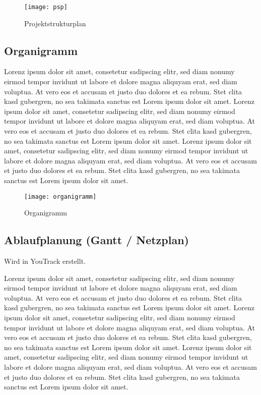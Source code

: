 \begin{figure}[H]
    \centering
    \texttt{[image: psp]}
    \caption{Projektstrukturplan}
\end{figure}

\subsection{Organigramm}\label{subsec:Organigramm}
Lorenz ipsum dolor sit amet, consetetur sadipscing elitr, sed diam nonumy eirmod tempor invidunt ut labore et dolore magna aliquyam erat, sed diam voluptua.
At vero eos et accusam et justo duo dolores et ea rebum.
Stet clita kasd gubergren, no sea takimata sanctus est Lorem ipsum dolor sit amet.
Lorenz ipsum dolor sit amet, consetetur sadipscing elitr, sed diam nonumy eirmod tempor invidunt ut labore et dolore magna aliquyam erat, sed diam voluptua.
At vero eos et accusam et justo duo dolores et ea rebum.
Stet clita kasd gubergren, no sea takimata sanctus est Lorem ipsum dolor sit amet.
Lorenz ipsum dolor sit amet, consetetur sadipscing elitr, sed diam nonumy eirmod tempor invidunt ut labore et dolore magna aliquyam erat, sed diam voluptua.
At vero eos et accusam et justo duo dolores et ea rebum.
Stet clita kasd gubergren, no sea takimata sanctus est Lorem ipsum dolor sit amet.

\begin{figure}[H]
    \centering
    \texttt{[image: organigramm]}
    \caption{Organigramm}
\end{figure}

\subsection{Ablaufplanung (Gantt / Netzplan)}\label{subsec:Ablaufplan}
Wird in YouTrack erstellt.

Lorenz ipsum dolor sit amet, consetetur sadipscing elitr, sed diam nonumy eirmod tempor invidunt ut labore et dolore magna aliquyam erat, sed diam voluptua.
At vero eos et accusam et justo duo dolores et ea rebum.
Stet clita kasd gubergren, no sea takimata sanctus est Lorem ipsum dolor sit amet.
Lorenz ipsum dolor sit amet, consetetur sadipscing elitr, sed diam nonumy eirmod tempor invidunt ut labore et dolore magna aliquyam erat, sed diam voluptua.
At vero eos et accusam et justo duo dolores et ea rebum.
Stet clita kasd gubergren, no sea takimata sanctus est Lorem ipsum dolor sit amet.
Lorenz ipsum dolor sit amet, consetetur sadipscing elitr, sed diam nonumy eirmod tempor invidunt ut labore et dolore magna aliquyam erat, sed diam voluptua.
At vero eos et accusam et justo duo dolores et ea rebum.
Stet clita kasd gubergren, no sea takimata sanctus est Lorem ipsum dolor sit amet.

